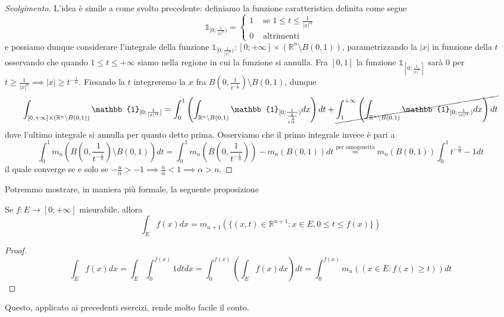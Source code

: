 \begin{proof}[Svolgimento]
	L'idea è simile a come svolto precedente: definiamo la funzione caratteristica definita come segue
	$$
	\mathbb{1}_{[0; \frac{1}{|x|^\alpha})} = \begin{cases} 1 & \text{ se } 1 \leq t \leq \frac{1}{|x|^\alpha} \\
		0 & \text{ altrimenti }
	\end{cases}
	$$
	e possiamo dunque considerare l'integrale della funzione $\mathbb{1}_{[0; \frac{1}{|x|^\alpha})} : [0; +\infty] \times (\mathbb{R}^n \setminus B(0,1))$, parametrizzando la $|x|$ in funzione della $t$ osservando che quando $1 \leq t \leq +\infty$ siamo nella regione in cui la funzione si annulla. Fra $[0, 1]$ la funzione $\mathbb{1}_{[0; \frac{1}{|x|^\alpha}]}$ sarà $0$ per $t \geq \frac{1}{|x|^\alpha} \implies |x| \geq t^{-\frac{1}{\alpha}}$. Fissando la $t$ integreremo la $x$ fra $B(0, \frac{1}{t^{-\frac{1}{\alpha}}}) \setminus B(0,1)$, dunque
	$$
	\int_{[0, +\infty] \times (\mathbb{R}^n \setminus B(0,1))} \mathbb{1}_{[0; \frac{1}{|x|^\alpha}]} = \int_0^{1} \left(\int_{\mathbb{R}^n \setminus B(0,1)} \mathbb{1}_{[0; \frac{1}{\frac{1}{t^{\frac{1}{\alpha}}}})} dx \right) dt + \cancel{\int_1^{+\infty} \left( \int_{\mathbb{R}^n \setminus B(0, 1)} \mathbb{1}_{[0; \frac{1}{|x|^\alpha})} dx \right) dt}
	$$
	dove l'ultimo integrale si annulla per quanto detto prima. Osserviamo che il primo integrale invece è pari a
	$$
	\int_0^1 m_n \left(B \left(0, \frac{1}{t^{-\frac{1}{\alpha}}} \right) \setminus B(0,1) \right)dt = \int_0^1 m_n \left( B \left(0, \frac{1}{t^{-\frac{1}{\alpha}}}\right) \right) - m_n(B(0, 1))dt \stackrel{\text{per omogeneità}}{=} m_n(B(0,1))\int_0^1 t^{-\frac{n}{\alpha}} - 1 dt
	$$
	il quale converge se e solo se $-\frac{n}{\alpha} > - 1 \implies \frac{n}{\alpha} < 1 \implies \alpha > n$.
\end{proof}
Potremmo mostrare, in maniera più formale, la seguente proposizione
\begin{prop}
	Se $f: E \to [0; +\infty]$ misurabile, allora
$$
\int_E f(x)dx = m_{n+1}(\{(x,t) \in \mathbb{R}^{n+1}: x \in E, 0 \leq t \leq f(x) \})
$$
\end{prop}
\begin{proof}
$$
\int_E f(x)dx = \int_E \int_0^{f(x)} 1 dtdx = \int_0^{f(x)} \left( \int_E f(x) dx \right) dt = \int_0^{f(x)} m_n({(x \in E: f(x) \geq t)})dt
$$
\end{proof}
Questo, applicato ai precedenti esercizi, rende molto facile il conto.

